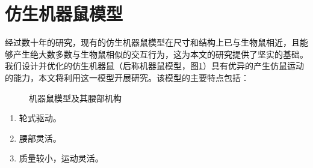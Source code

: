 \section{仿生机器鼠模型}
经过数十年的研究，现有的仿生机器鼠模型在尺寸和结构上已与生物鼠相近，且能够产生绝大数多数与生物鼠相似的交互行为，这为本文的研究提供了坚实的基础。我们设计并优化的仿生机器鼠（后称机器鼠模型，图\ref{figure_ratbot}）具有优异的产生仿鼠运动的能力\cite{liDesignOptimizationLightweight2020}，本文将利用这一模型开展研究。该模型的主要特点包括：
\begin{figure}[htbp]
  \centering
  \caption{机器鼠模型及其腰部机构\cite{liDesignOptimizationLightweight2020}}\label{figure_ratbot} %
\end{figure}
\begin{enumerate}[leftmargin=0em, topsep=0em, label=（\theenumi）]
\setlength{\itemindent}{4em}
\setlength{\labelsep}{0em}
\setlength{\labelwidth}{2em}
\setlength{\parsep}{0em}
\setlength{\itemsep}{0em}
\setlength{\topsep}{0em}
  \item 轮式驱动。
  \item 腰部灵活。
  \item 质量较小，运动灵活。
\end{enumerate}

